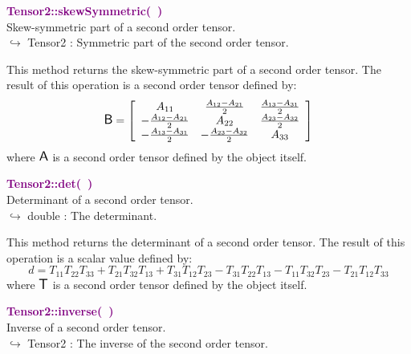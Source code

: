 \textcolor{purple}{\textbf{Tensor2::skewSymmetric(~)}}\label{Tensor2::skewSymmetric()}\\
Skew-symmetric part of a second order tensor.\\ \hspace*{10mm}$\hookrightarrow$ Tensor2 : Symmetric part of the second order tensor.

This method returns the skew-symmetric part of a second order tensor.
The result of this operation is a second order tensor defined by:
\begin{equation*}
\mbox{\large\ensuremath{\mathsf{B}}} = \left[\begin{array}{ccc}
 A_{11} & \frac{A_{12} - A_{21}}{2} & \frac{A_{13} - A_{31}}{2}\\
 -\frac{A_{12} -  A_{21}}{2} & A_{22} & \frac {A_{23} - A_{32}}{2}\\
 -\frac{A_{13} - A_{31}}{2} & -\frac {A_{23} - A_{32}}{2} & A_{33}\end{array}
\right]
\end{equation*}
where $\mbox{\large\ensuremath{\mathsf{A}}}$ is a second order tensor defined by the object itself.

\textcolor{purple}{\textbf{Tensor2::det(~)}}\label{Tensor2::det()}\\
Determinant of a second order tensor.\\ \hspace*{10mm}$\hookrightarrow$ double : The determinant.

This method returns the determinant of a second order tensor.
The result of this operation is a scalar value defined by:
\begin{equation*}
d = T_{11} T_{22} T_{33} + T_{21} T_{32} T_{13} + T_{31} T_{12} T_{23} - T_{31} T_{22} T_{13} - T_{11} T_{32} T_{23} - T_{21} T_{12} T_{33}
\end{equation*}
where $\mbox{\large\ensuremath{\mathsf{T}}}$ is a second order tensor defined by the object itself.

\textcolor{purple}{\textbf{Tensor2::inverse(~)}}\label{Tensor2::inverse()}\\
Inverse of a second order tensor.\\ \hspace*{10mm}$\hookrightarrow$ Tensor2 : The inverse of the second order tensor.

